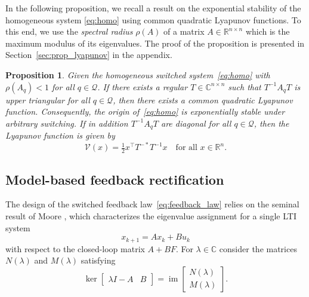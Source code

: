 \documentclass[11pt]{article}
\newcommand{\C}{\mathbb{C}}
\theoremstyle{plain}
\newtheorem{proposition}[theorem]{Proposition}
\theoremstyle{definition}
\theoremstyle{remark}
\begin{document}
In the following proposition,
we recall a result on the exponential stability of the homogeneous system \eqref{eq:homo} using common quadratic Lyapunov functions. To this end, we use the \emph{spectral radius} $\rho(A)$ of a matrix $A\in\mathbb{R}^{n\times n}$ which is the maximum modulus of its eigenvalues. The proof of the proposition is presented in Section~\ref{sec:prop_lyapunov} in the appendix.
\begin{proposition}
\label{prop:lyapunov}
Given the homogeneous switched system~\eqref{eq:homo} with $\rho(A_q)<1$ for all $q\in\mathcal Q$. If there exists a regular $T\in\C^{n\times n}$ such that $T^{-1}A_q T$ is upper triangular for all $q\in\mathcal Q$, then there exists a common quadratic Lyapunov function. Consequently, the origin of~\eqref{eq:homo} is exponentially stable under arbitrary switching. If in addition $T^{-1}A_q T$ are diagonal for all $q\in\mathcal Q$, then the Lyapunov function is given by
    \[
    \mathcal{V}(x)=\tfrac{1}{2}x^\top T^{-*}T^{-1}x\quad \text{for all $x\in\mathbb{R}^n$}.
    \]
\end{proposition}

\subsection{Model-based feedback rectification}
\label{ssec:feedbackrectification}
The design of the switched feedback law~\eqref{eq:feedback_law} relies on the seminal result of Moore \cite{Moore76}, which characterizes the eigenvalue assignment for a single LTI system
\begin{equation}
    \label{eq:LTI_sys}
    x_{k+1} = A x_k + B u_k
\end{equation}
with respect to the closed-loop matrix $A + BF$. For $\lambda\in\C$ consider the matrices $N(\lambda)$ and $M(\lambda)$ satisfying
\begin{equation}
    \label{eq:NlambMlamb}
    \operatorname{ker}\begin{bmatrix}
        \lambda I - A & B
    \end{bmatrix} = \operatorname{im}\begin{bmatrix}
        N(\lambda)\\ M(\lambda)
    \end{bmatrix}.
\end{equation}
\end{document}
